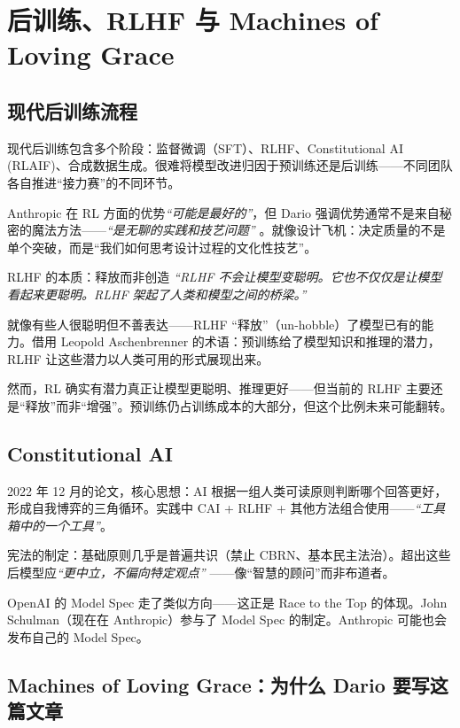 \documentclass[a4paper]{article}
\begin{document}
\section{后训练、RLHF 与 Machines of Loving Grace}

\subsection{现代后训练流程}

现代后训练包含多个阶段：监督微调（SFT）、RLHF、Constitutional AI (RLAIF)、合成数据生成。很难将模型改进归因于预训练还是后训练——不同团队各自推进``接力赛''的不同环节。

Anthropic 在 RL 方面的优势\textit{``可能是最好的''}，但 Dario 强调优势通常不是来自秘密的魔法方法——\textit{``是无聊的实践和技艺问题''} 。就像设计飞机：决定质量的不是单个突破，而是``我们如何思考设计过程的文化性技艺''。

\begin{importantbox}{RLHF 的本质：释放而非创造}
\textit{``RLHF 不会让模型变聪明。它也不仅仅是让模型看起来更聪明。RLHF 架起了人类和模型之间的桥梁。''}

就像有些人很聪明但不善表达——RLHF ``释放''（un-hobble）了模型已有的能力。借用 Leopold Aschenbrenner 的术语：预训练给了模型知识和推理的潜力，RLHF 让这些潜力以人类可用的形式展现出来。

然而，RL 确实有潜力真正让模型更聪明、推理更好——但当前的 RLHF 主要还是``释放''而非``增强''。预训练仍占训练成本的大部分，但这个比例未来可能翻转。
\end{importantbox}

\subsection{Constitutional AI}

2022 年 12 月的论文，核心思想：AI 根据一组人类可读原则判断哪个回答更好，形成自我博弈的三角循环。实践中 CAI + RLHF + 其他方法组合使用——\textit{``工具箱中的一个工具''}。

宪法的制定：基础原则几乎是普遍共识（禁止 CBRN、基本民主法治）。超出这些后模型应\textit{``更中立，不偏向特定观点''} ——像``智慧的顾问''而非布道者。

OpenAI 的 Model Spec 走了类似方向——这正是 Race to the Top 的体现。John Schulman（现在在 Anthropic）参与了 Model Spec 的制定。Anthropic 可能也会发布自己的 Model Spec。

\subsection{Machines of Loving Grace：为什么 Dario 要写这篇文章}
\end{document}
